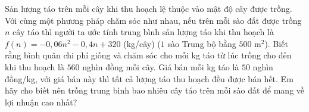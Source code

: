 \begin{bt}%
	Sản lượng táo trên mỗi cây khi thu hoạch lệ thuộc vào mật độ cây được trồng. Với cùng một phương pháp chăm sóc như nhau, nếu trên mỗi sào đất được trồng $n$ cây táo thì người ta ước tính trung bình sản lượng táo khi thu hoạch là $f(n)=-0{,}06 n^{2}-0{,}4 n+320$ (kg/cây) ($1$ sào Trung bộ bằng $500$ m$^2$). Biết rằng bình quân chi phí giống và chăm sóc cho mỗi kg táo từ lúc trồng cho đến khi thu hoạch là $560$ nghìn đồng mỗi cây. Giá bán mỗi kg táo là $50$ nghìn đồng/kg, với giá bán này thì tất cả lượng táo thu hoạch đều được bán hết. Em hãy cho biết  nên trồng trung bình bao nhiêu cây táo trên mỗi sào đất để mang về lợi nhuận cao nhất?
\end{bt}

